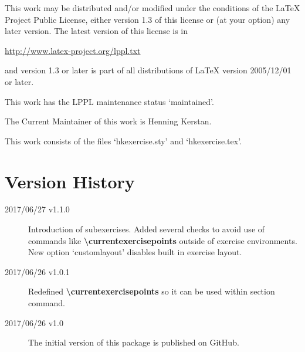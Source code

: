 \documentclass[
  twocolumn,%
  fontsize=9pt,%
  DIV=calc,%
  numbers=noendperiod%
]{scrartcl}
\begin{document}
\noindent This work may be distributed and/or modified under the conditions of the LaTeX Project Public License, either version 1.3 of this license or (at your option) any later version. The latest version of this license is in\medskip
 
   \url{http://www.latex-project.org/lppl.txt}\medskip
   
\noindent and version 1.3 or later is part of all distributions of LaTeX version 2005/12/01 or later.\medskip
 
 \noindent This work has the LPPL maintenance status `maintained'.\medskip
 
 \noindent The Current Maintainer of this work is Henning Kerstan.\medskip

 \noindent This work consists of the files `hkexercise.sty' and `hkexercise.tex'.


\section{Version History}
\begin{description}
\item[2017/06/27 v1.1.0] Introduction of subexercises. Added several checks to avoid use of commands like \textcolor{NavyBlue}{\ttfamily\bfseries\textbackslash currentexercisepoints} outside of exercise environments. New option `customlayout' disables built in exercise layout.
\item[2017/06/26 v1.0.1] Redefined \textcolor{NavyBlue}{\ttfamily\bfseries\textbackslash currentexercisepoints} so it can be used within section command. 
\item[2017/06/26 v1.0] The initial version of this package is published on GitHub.
\end{description}
\end{document}
